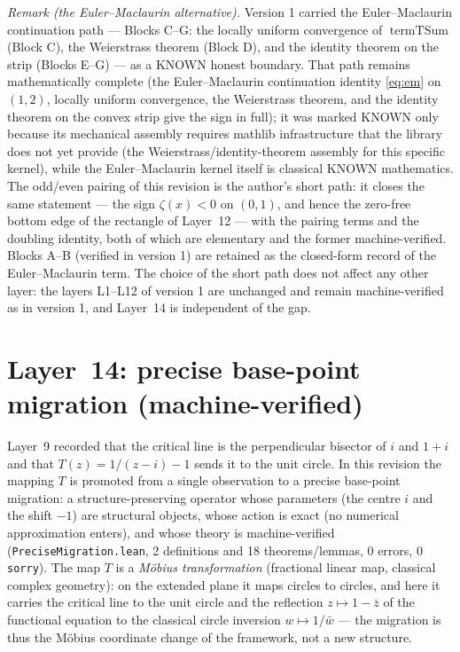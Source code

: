 \documentclass{article}
\newcommand{\zt}{\zeta}
\begin{document}
\emph{Remark (the Euler--Maclaurin alternative).} Version 1 carried the
Euler--Maclaurin continuation path --- Blocks C--G: the locally uniform
convergence of $\operatorname{termTSum}$ (Block C), the Weierstrass theorem
(Block D), and the identity theorem on the strip (Blocks E--G) --- as a
KNOWN honest boundary. That path remains mathematically complete (the
Euler--Maclaurin continuation identity \eqref{eq:em} on $(1,2)$, locally
uniform convergence, the Weierstrass theorem, and the identity theorem on
the convex strip give the sign in full); it was marked KNOWN only because
its mechanical assembly requires mathlib infrastructure that the library
does not yet provide (the Weierstrass/identity-theorem assembly for this
specific kernel), while the Euler--Maclaurin kernel itself is classical
KNOWN mathematics. The odd/even pairing of this revision is the author's
short path: it closes the same statement --- the sign $\zt(x)<0$ on
$(0,1)$, and hence the zero-free bottom edge of the rectangle of
Layer~12 --- with the pairing terms and the doubling identity, both of
which are elementary and the former machine-verified. Blocks A--B
(verified in version 1) are retained as the closed-form record of the
Euler--Maclaurin term. The choice of the short path does not affect any
other layer: the layers L1--L12 of version 1 are unchanged and remain
machine-verified as in version 1, and Layer~14 is independent of the gap.

\section{Layer~14: precise base-point migration (machine-verified)}
\label{sec:L14}

Layer~9 recorded that the critical line is the perpendicular bisector of
$i$ and $1+i$ and that $T(z)=1/(z-i)-1$ sends it to the unit circle.
In this revision the mapping $T$ is promoted from a single observation to a
precise base-point migration: a structure-preserving operator whose
parameters (the centre $i$ and the shift $-1$) are structural objects, whose
action is exact (no numerical approximation enters), and whose theory is
machine-verified (\texttt{PreciseMigration.lean}, 2 definitions and 18
theorems/lemmas, 0 errors, 0 \texttt{sorry}). The map $T$ is a
\emph{M\"obius transformation} (fractional linear map, classical complex
geometry): on the extended plane it maps circles to circles, and here it
carries the critical line to the unit circle and the reflection
$z\mapsto1-\bar z$ of the functional equation to the classical circle
inversion $w\mapsto1/\bar w$ --- the migration is thus the M\"obius
coordinate change of the framework, not a new structure.
\end{document}
